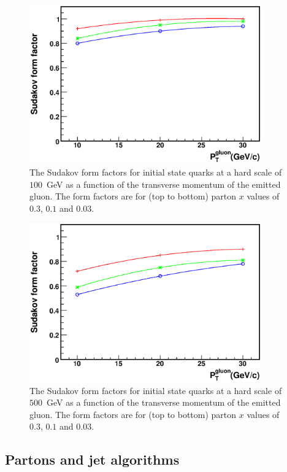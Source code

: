 \documentclass[12pt]{iopart}
\begin{document}
%
\begin{figure}[t]
\begin{center}
\includegraphics[width=10cm,angle=0]{sudakov_quark_100gev.eps}
\end{center}
\vspace*{-0.5cm}
\caption{The Sudakov form factors for initial state quarks at a hard scale of $100$~GeV as a function of the
transverse momentum of the emitted gluon. The form factors are for (top to bottom) parton $x$ values of
$0.3$, $0.1$ and $0.03$.
\label{fig:quark_100}}
\end{figure}
%
\begin{figure}[t]
\begin{center}
\includegraphics[width=10cm,angle=0]{sudakov_quark_500gev.eps}
\end{center}
\vspace*{-0.5cm}
\caption{The Sudakov form factors for initial state quarks at a hard scale of $500$~GeV as a function of the
transverse momentum of the emitted gluon. The form factors are for (top to bottom) parton $x$ values of
$0.3$, $0.1$ and $0.03$.
\label{fig:quark_500}}
\end{figure}

\subsection{Partons and jet algorithms}
\label{sec:jetalgs}
\end{document}
